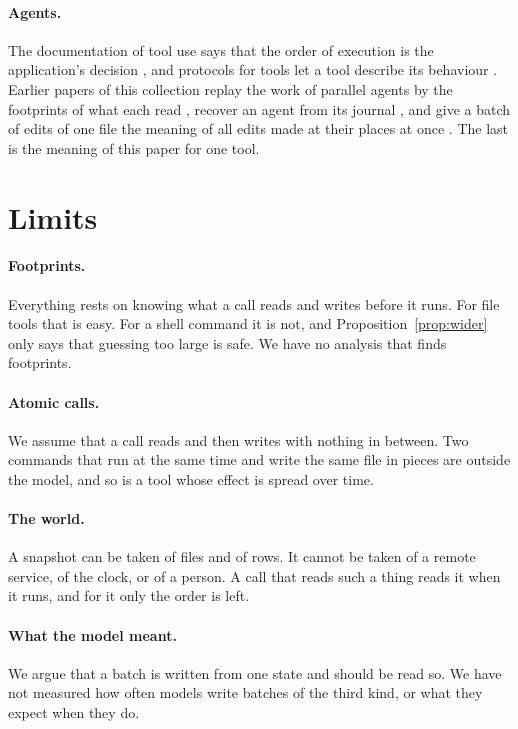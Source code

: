 \documentclass[acmsmall,nonacm,screen]{acmart}
\begin{document}
\paragraph{Agents.} The documentation of tool use says that the order of execution is the
application's decision \citep{claudeparallel}, and protocols for tools let a tool describe
its behaviour \citep{mcptools}. Earlier papers of this collection replay the work of
parallel agents by the footprints of what each read \citep{tpp9}, recover an agent from its
journal \citep{tpp8}, and give a batch of edits of one file the meaning of all edits made at
their places at once \citep{tpp19}. The last is the meaning of this paper for one tool.

\section{Limits}\label{sec:limits}

\paragraph{Footprints.} Everything rests on knowing what a call reads and writes before it
runs. For file tools that is easy. For a shell command it is not, and
Proposition~\ref{prop:wider} only says that guessing too large is safe. We have no analysis
that finds footprints.

\paragraph{Atomic calls.} We assume that a call reads and then writes with nothing in
between. Two commands that run at the same time and write the same file in pieces are
outside the model, and so is a tool whose effect is spread over time.

\paragraph{The world.} A snapshot can be taken of files and of rows. It cannot be taken of a
remote service, of the clock, or of a person. A call that reads such a thing reads it when
it runs, and for it only the order is left.

\paragraph{What the model meant.} We argue that a batch is written from one state and should
be read so. We have not measured how often models write batches of the third kind, or what
they expect when they do.
\end{document}
